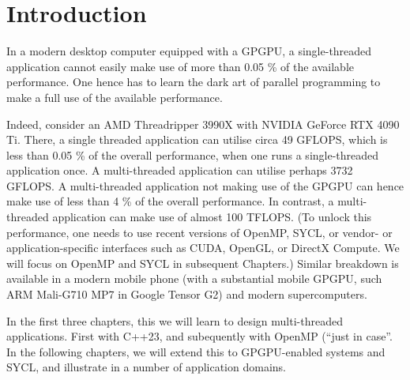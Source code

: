 \chapter{Introduction}

In a modern desktop computer equipped with a GPGPU, a single-threaded application cannot easily make use of more than 0.05 \% of the available performance. One hence has to learn the dark art of parallel programming to make a full use of the available performance.  

Indeed, consider an AMD Threadripper 3990X with NVIDIA GeForce RTX 4090 Ti. There, a single threaded application can utilise circa 49 GFLOPS, which is less than 0.05 \% of the overall performance, when one runs a single-threaded application once.
A multi-threaded application can utilise perhaps 3732 GFLOPS. A multi-threaded application not making use of the GPGPU can hence make use of less than 4 \%  of the overall performance. 
In contrast, a multi-threaded application can make use of almost 100 TFLOPS.
(To unlock this performance, one needs to use recent versions of OpenMP, SYCL, or vendor- or application-specific interfaces such as CUDA, OpenGL, or DirectX Compute. We will focus on OpenMP and SYCL in subsequent Chapters.)
Similar breakdown is available in a modern mobile phone (with a substantial mobile GPGPU, such ARM Mali-G710 MP7 in Google Tensor G2) and modern supercomputers.

  
In the first three chapters, this we will learn to design multi-threaded applications. First with C++23, and subequently with OpenMP (``just in case''. In the following chapters, we will extend this to GPGPU-enabled systems and SYCL, and illustrate in a number of application domains.  